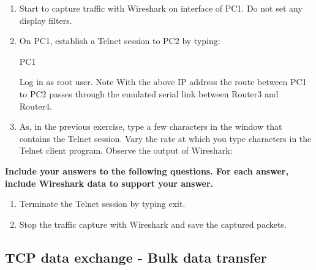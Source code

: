 \begin{enumerate}
	\item Start to capture traffic with Wireshark on interface  of PC1. Do not set any display filters.
	\item On PC1, establish a Telnet session to PC2 by typing: 
		\begin{cmdblock}
	PC1%
		\end{cmdblock}
		Log in as root user. Note With the above IP address the route between PC1 to PC2 passes through the emulated serial link between Router3 and Router4.
	\item As, in the previous exercise, type a few characters in the window that contains the Telnet session. Vary the rate at which you type characters in the Telnet client program. Observe the output of Wireshark:
\end{enumerate}

\textbf{Include your answers to the following questions. For each answer, include Wireshark data to support your answer.}
\begin{questions}
\end{questions}

\begin{enumerate}[resume]
	\item Terminate the Telnet session by typing exit.
	\item Stop the traffic capture with Wireshark and save the captured packets.
\end{enumerate}

\begin{questions}
\end{questions}

\newpage
\subsection{TCP data exchange - Bulk data transfer}

